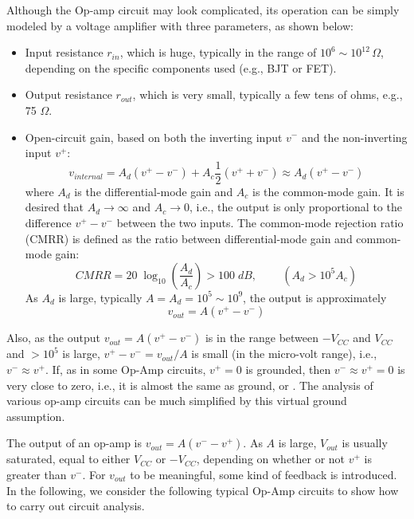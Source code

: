 Although the Op-amp circuit may look complicated, its operation can be simply 
modeled by a voltage amplifier with three parameters, as shown below:


\begin{itemize}
\item Input resistance $r_{in}$, which is huge, typically in the range of 
  $10^6\sim 10^{12}\,\Omega$, depending on the specific components used (e.g., 
  BJT or FET).

\item Output resistance $r_{out}$, which is very small, typically a few tens of
  ohms, e.g., 75 $\Omega$.

\item Open-circuit gain, based on both the inverting input $v^-$ and the non-inverting 
  input $v^+$:
  \[v_{internal}=A_d (v^+ - v^-)+A_c \frac{1}{2}(v^+ + v^-)\approx A_d (v^+ - v^-) \]
  where $A_d$ is the differential-mode gain and $A_c$ is the common-mode gain.
  It is desired that $A_d\rightarrow \infty$ and $A_c\rightarrow 0$, i.e., the 
  output is only proportional to the difference $v^+-v^-$ between the two inputs. 
  The common-mode rejection ratio (CMRR) is defined as the ratio between 
  differential-mode gain and common-mode gain:
  \[ CMRR=20\;\log_{10} \left(\frac{A_d}{A_c}\right)>100\;dB,
  \;\;\;\;\;\;\;\;(A_d>10^5 A_c) \]
  As $A_d$ is large, typically $A=A_d=10^5 \sim 10^9$, the output is approximately
  \[ v_{out}=A(v^+-v^-) \]
\end{itemize}

Also, as the output $v_{out}=A(v^+-v^-)$ is in the range between $-V_{CC}$ and $V_{CC}$ 
and $>10^5$ is large, $v^+-v^-=v_{out}/A$ is small (in the micro-volt range), i.e.,
$v^-\approx v^+$. If, as in some Op-Amp circuits, $v^+=0$ is grounded, then 
$v^-\approx v^+=0$ is very close to zero, i.e., it is almost the same as ground, or
.
The analysis of various op-amp circuits can be much simplified by this virtual
ground assumption.

The output of an op-amp is $v_{out}=A(v^--v^+)$. As $A$ is large, $V_{out}$ is usually
saturated, equal to either $V_{CC}$ or $-V_{CC}$, depending on whether or not $v^+$ 
is greater than $v^-$. For $v_{out}$ to be meaningful, some kind of feedback is 
introduced. In the following, we consider the following typical Op-Amp circuits 
to show how to carry out circuit analysis.

